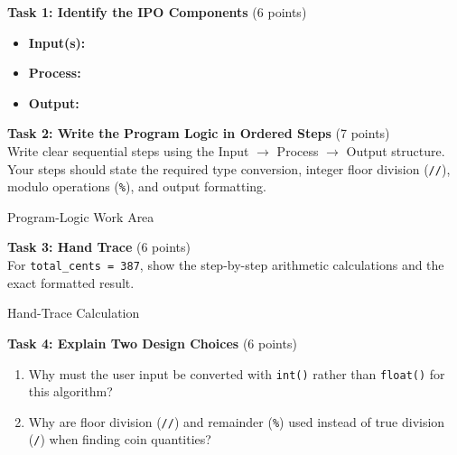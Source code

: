 \documentclass[11pt,a4paper]{article}
\begin{document}
\vspace{1mm}
\textbf{Task 1: Identify the IPO Components} (6 points)
\begin{itemize}[leftmargin=2em]
  \item \textbf{Input(s):} \hrulefill\\[4mm]
  \item \textbf{Process:} \hrulefill\\[4mm]
  \item \textbf{Output:} \hrulefill
\end{itemize}

\vspace{1mm}
\textbf{Task 2: Write the Program Logic in Ordered Steps} (7 points)\\
Write clear sequential steps using the Input $\rightarrow$ Process $\rightarrow$ Output structure. Your steps should state the required type conversion, integer floor division (\texttt{//}), modulo operations (\texttt{\%}), and output formatting.

\begin{answerbox}[height=8.0cm]{Program-Logic Work Area}
\end{answerbox}

\vspace{1mm}
\textbf{Task 3: Hand Trace} (6 points)\\
For \texttt{total\_cents = 387}, show the step-by-step arithmetic calculations and the exact formatted result.

\begin{answerbox}[height=3.7cm]{Hand-Trace Calculation}
\end{answerbox}

\vspace{1mm}
\textbf{Task 4: Explain Two Design Choices} (6 points)
\begin{enumerate}[label=\alph*),leftmargin=2em]
  \item Why must the user input be converted with \texttt{int()} rather than \texttt{float()} for this algorithm?\\[5mm]
  \hrulefill
  \item Why are floor division (\texttt{//}) and remainder (\texttt{\%}) used instead of true division (\texttt{/}) when finding coin quantities?\\[5mm]
  \hrulefill
\end{enumerate}

\newpage

\end{document}
